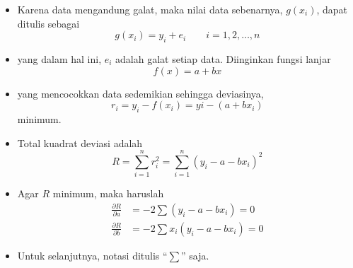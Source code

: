\documentclass[pdflatex,compress,mathserif]{beamer}
\begin{document}
\begin{frame}
	\begin{itemize}
		\item Karena data mengandung galat, maka nilai data sebenarnya,
$ g(x_i) $, dapat ditulis sebagai
		\begin{equation}
			g(x_i) = y_i + e_i\qquad i = 1, 2, \dots, n
		\end{equation}
		\item yang dalam hal ini, $ e_i $ adalah galat setiap data. Diinginkan
fungsi lanjar
		\begin{equation}
			f(x) = a + bx
		\end{equation}
		\item yang mencocokkan data sedemikian sehingga deviasinya,
		\begin{equation}
			r_i = y_i - f(x_i) = yi - (a + bx_i)
		\end{equation}
		minimum.
	\end{itemize}
\end{frame}

\begin{frame}
	\begin{itemize}
		\item Total kuadrat deviasi adalah
		\begin{equation*}
			R = \sum_{i=1}^{n}r_i^2 = \sum_{i=1}^{n}(y_i - a - bx_i)^2
		\end{equation*}
		\item Agar $ R $ minimum, maka haruslah
		\begin{align*}
			\frac{\partial R}{\partial a} &= -2\sum(y_i - a - bx_i) = 0 \\
			\frac{\partial R}{\partial b} &= -2\sum x_i(y_i - a - bx_i) = 0
		\end{align*}
		\item Untuk selanjutnya, notasi ditulis “$ \sum $” saja.
	\end{itemize}
\end{frame}
\end{document}
